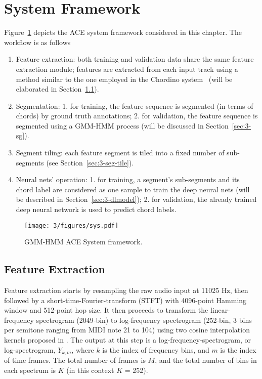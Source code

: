 
\section{System Framework} \label{sec:3-sysframe}

Figure~\ref{fig:3-sysover} depicts the ACE system framework considered in this chapter. The workflow is as follows%
\begin{enumerate}
	\item Feature extraction: both training and validation data share the same feature extraction module; features are extracted from each input track using a method similar to the one employed in the Chordino system~\cite{mauch2010automatic} (will be elaborated in Section~\ref{sec:3-fe}).
	\item Segmentation: 1. for training, the feature sequence is segmented (in terms of chords) by ground truth annotations; 2. for validation, the feature sequence is segmented using a GMM-HMM process (will be discussed in Section~\ref{sec:3-sg}).
	\item Segment tiling: each feature segment is tiled into a fixed number of sub-segments (see Section~\ref{sec:3-seg-tile}).
	\item Neural nets' operation: 1. for training, a segment's sub-segments and its chord label are considered as one sample to train the deep neural nets (will be described in Section~\ref{sec:3-dlmodel}); 2. for validation, the already trained deep neural network is used to predict chord labels.
\end{enumerate}

\begin{figure}
\centering
\texttt{[image: 3/figures/sys.pdf]}
\caption{GMM-HMM ACE System framework.}
\label{fig:3-sysover}
\end{figure}

\subsection{Feature Extraction} \label{sec:3-fe}
Feature extraction starts by resampling the raw audio input at 11025 Hz, then followed by a short-time-Fourier-transform (STFT) with 4096-point Hamming window and 512-point hop size. It then proceeds to transform the linear-frequency spectrogram (2049-bin) to log-frequency spectrogram (252-bin, 3 bins per semitone ranging from MIDI note 21 to 104) using two cosine interpolation kernels proposed in \cite{mauch2010automatic}. The output at this step is a log-frequency-spectrogram, or log-spectrogram, $Y_{k,m}$, where $k$ is the index of frequency bins, and $m$ is the index of time frames. The total number of frames is $M$, and the total number of bins in each spectrum is $K$ (in this context $K$ = 252).

